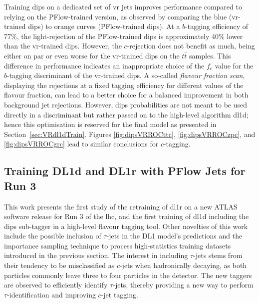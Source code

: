 Training \gls{dips} on a dedicated set of \gls{vr} jets improves performance compared to relying on the PFlow-trained version, as observed by comparing the blue (\gls{vr}-trained \gls{dips}) to orange curves (PFlow-trained \gls{dips}). At a $b$-tagging efficiency of 77\%, the light-rejection of the PFlow-trained \gls{dips} is approximately 40\% lower than the \gls{vr}-trained \gls{dips}. However, the $c$-rejection does not benefit as much, being either on par or even worse for the \gls{vr}-trained \gls{dips} on the $t\bar{t}$ samples. This difference in performance indicates an inappropriate choice of the $f_c$ value for the $b$-tagging discriminant of the \gls{vr}-trained \gls{dips}. A so-called \textit{flavour fraction scan}, displaying the rejections at a fixed tagging efficiency for different values of the flavour fraction, can lead to a better choice for a balanced improvement in both background jet rejections. However, \gls{dips} probabilities are not meant to be used directly in a discriminant but rather passed on to the high-level algorithm \gls{dl1d}; hence this optimisation is reserved for the final model as presented in Section~\ref{sec:VRdl1dTrain}. Figures \ref{fig:dipsVRROCttc}, \ref{fig:dipsVRROCzpc}, and \ref{fig:dipsVRROCgrc} lead to similar conclusions for $c$-tagging.

\subsection{Training DL1d and DL1r with PFlow Jets for Run 3}
This work presents the first study of the retraining of \gls{dl1r} on a new ATLAS software release for Run 3 of the \gls{lhc}, and the first training of \gls{dl1d} including the \gls{dips} sub-tagger in a high-level flavour tagging tool. Other novelties of this work include the possible inclusion of $\tau$-jets in the DL1 model's predictions and the importance sampling technique to process high-statistics training datasets introduced in the previous section. The interest in including $\tau$-jets stems from their tendency to be misclassified as $c$-jets when hadronically decaying, as both particles commonly leave three to four particles in the detector. The new taggers are observed to efficiently identify $\tau$-jets, thereby providing a new way to perform $\tau$-identification and improving $c$-jet tagging.\\ %

